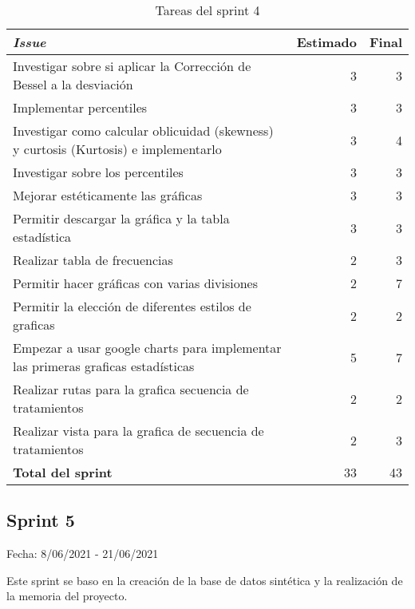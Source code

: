 \begin{table}[H]
	 \begin{tabularx}{\linewidth}{X r r}
	 	\toprule \textbf{\textit{Issue}} & \textbf{Estimado} & \textbf{Final}\\
	 	\toprule
	 	Investigar sobre si aplicar la Corrección de Bessel a la desviación & 3 & 3 \\
        Implementar percentiles & 3 & 3 \\
        Investigar como calcular oblicuidad (skewness) y curtosis (Kurtosis) e implementarlo  & 3 & 4 \\
        Investigar sobre los percentiles & 3 & 3 \\
        Mejorar estéticamente las gráficas & 3 & 3 \\
        Permitir descargar la gráfica y la tabla estadística & 3 & 3 \\
        Realizar tabla de frecuencias & 2 & 3 \\
        Permitir hacer gráficas con varias divisiones & 2 & 7 \\
        Permitir la elección de diferentes estilos de graficas & 2 & 2 \\
        Empezar a usar google charts para implementar las primeras graficas estadísticas & 5 & 7 \\
        Realizar rutas para la grafica secuencia de tratamientos & 2 & 2 \\
        Realizar vista para la grafica de secuencia de tratamientos & 2 & 3 \\
        \midrule
	    \textbf{Total del sprint} & 33 & 43 \\
	 	\bottomrule
	 \end{tabularx}
	 \caption{Tareas del sprint 4}
\end{table}

\subsection{Sprint 5}

Fecha: 8/06/2021 - 21/06/2021

Este sprint se baso en la creación de la base de datos sintética y la realización de la memoria del proyecto.



